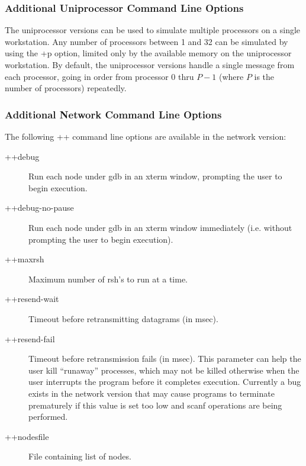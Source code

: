 \subsubsection[Additional Uniprocessor Command Line Options]
{Additional Uniprocessor Command Line Options}
\label{uniprocessor command line options}

The uniprocessor versions can be used to simulate multiple
processors on a single workstation.  Any number of processors between 1 and 32 can be simulated by
using the {\fexec +p} option, limited only by the available memory on the
uniprocessor workstation.  By default, the uniprocessor versions handle
a single message from each processor, going in order from processor 0
thru $P-1$ (where $P$ is the number of processors) repeatedly.  

\subsubsection[Additional Network Command Line Options]
{Additional Network Command Line Options}
\label{network command line options}

The following {\fexec ++} command line options are available in
the network version:
\begin{description}

\item[{\fexec ++debug}] Run each node under gdb in an xterm window, prompting
the user to begin execution.

\item[{\fexec ++debug-no-pause}] Run each node under gdb in an xterm window
immediately (i.e. without prompting the user to begin execution).

\item[{\fexec ++maxrsh}] Maximum number of {\fcmd rsh}'s to run at a
time.

\item[{\fexec ++resend-wait}] Timeout before retransmitting datagrams
(in msec).

\item[{\fexec ++resend-fail}] Timeout before retransmission fails (in
msec).
This parameter can help the user kill ``runaway'' processes, which may not
be killed otherwise when the user interrupts the program before it 
completes execution.
Currently a bug exists in the network version that may cause programs to
terminate prematurely if this value is set too low and {\fexec scanf} 
operations are being performed.

\item[{\fexec ++nodesfile}] File containing list of nodes.

\end{description}

